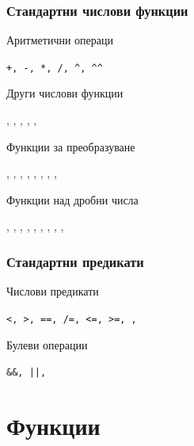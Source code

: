 \documentclass[alsotrans,beameroptions={aspectratio=169}]{beamerswitch}
\begin{document}
\begin{frame}
  \frametitle{Стандартни числови функции}

  Аритметични операци

  \tt{+}, \tt{-}, \tt{*}, \tt{/}, \tt{\^{}}, \tt{\^{}\^{}}

  \vspace{2ex}
  Други числови функции

  , , , , , 

  \vspace{2ex}
  Функции за преобразуване

  , , , , , , , , 

  \vspace{2ex}
  Функции над дробни числа

  , , , , , , , , , \lst{**}
\end{frame}

\begin{frame}
  \frametitle{Стандартни предикати}

  Числови предикати

  \tt{<}, \tt{>}, \tt{==}, \tt{/=}, \tt{<=}, \tt{>=}, , 

  \vspace{2ex}
  Булеви операции

  \tt{\&\&}, \tt{||}, 
\end{frame}

\section{Функции}
\end{document}
